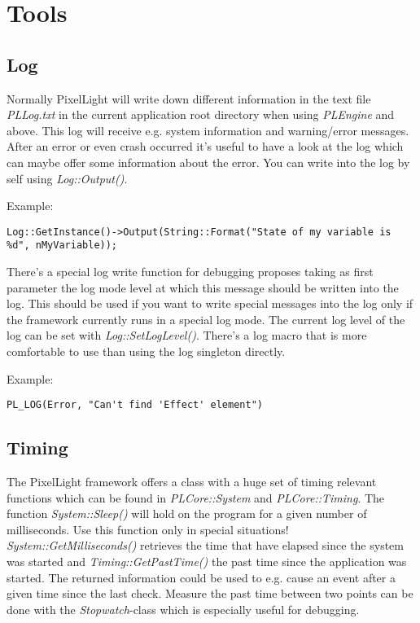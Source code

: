 \section{Tools}




\subsection{Log}
Normally PixelLight will write down different information in the text file \emph{PLLog.txt} in the current application root directory when using \emph{PLEngine} and above. This log will receive e.g. system information and warning/error messages. After an error or even crash occurred it's useful to have a look at the log which can maybe offer some information about the error. You can write into the log by self using \emph{Log::Output()}.

Example:

\begin{lstlisting}[caption=Using the log singleton directly]
Log::GetInstance()->Output(String::Format("State of my variable is %d", nMyVariable));
\end{lstlisting}

There's a special log write function for debugging proposes taking as first parameter the log mode level at which this message should be written into the log. This should be used if you want to write special messages into the log only if the framework currently runs in a special log mode. The current log level of the log can be set with \emph{Log::SetLogLevel()}. There's a log macro that is more comfortable to use than using the log singleton directly.

Example:

\begin{lstlisting}[caption=Using the log singleton though the log macros]
PL_LOG(Error, "Can't find 'Effect' element")
\end{lstlisting}





\subsection{Timing}
The PixelLight framework offers a class with a huge set of timing relevant functions which can be found in \emph{PLCore::System} and \emph{PLCore::Timing}. The function \emph{System::Sleep()} will hold on the program for a given number of milliseconds. Use this function only in special situations! \emph{System::GetMilliseconds()} retrieves the time that have elapsed since the system was started and \emph{Timing::GetPastTime()} the past time since the application was started. The returned information could be used to e.g. cause an event after a given time since the last check. Measure the past time between two points can be done with the \emph{Stopwatch}-class which is especially useful for debugging.


